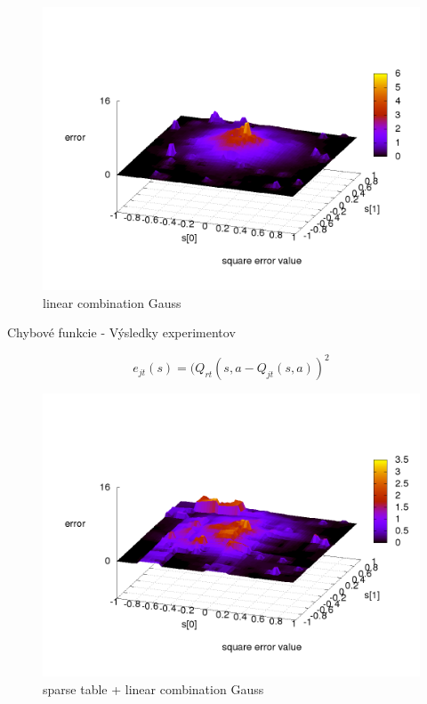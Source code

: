 \begin{figure}[!htb]
\centering
\includegraphics[scale=.4]{../../results_q_learning/map_1/function_type_2/q_learning_error.png}
\caption{linear combination Gauss}
\end{figure}



Chybové funkcie - Výsledky experimentov

\begin{equation}
e_{jt}(s) = (Q_{rt}(s,a - Q_{jt}(s,a))^2  \nonumber
\end{equation}

\begin{figure}[!htb]
\centering
\includegraphics[scale=.4]{../../results_q_learning/map_1/function_type_3/q_learning_error.png}
\caption{sparse table + linear combination Gauss}
\end{figure}



